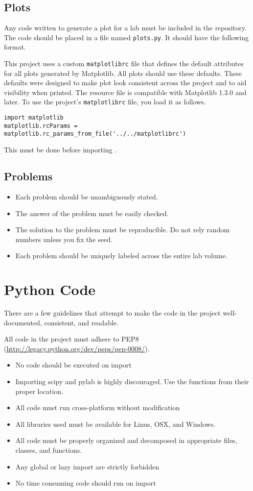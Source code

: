 \subsection{Plots}
Any code written to generate a plot for a lab must be included in the repository.
The code should be placed in a file named \texttt{plots.py}.
It should have the following format.


This project uses a custom \texttt{matplotlibrc} file that defines the default attributes for all plots generated by Matplotlib.
All plots should use these defaults.
These defaults were designed to make plot look consistent across the project and to aid visibility when printed.
The resource file is compatible with Matplotlib 1.3.0 and later.
To use the project's \texttt{matplotlibrc} file, you load it as follows.
\begin{lstlisting}
import matplotlib
matplotlib.rcParams = matplotlib.rc_params_from_file('../../matplotlibrc')
\end{lstlisting}
This must be done before importing .

\subsection{Problems}
\begin{itemize}
\item Each problem should be unambiguously stated.
\item The answer of the problem must be easily checked.
\item The solution to the problem must be reproducible.  Do not rely random numbers unless you fix the seed.
\item Each problem should be uniquely labeled across the entire lab volume.
\end{itemize}

\section{Python Code}
There are a few guidelines that attempt to make the code in the project well-documented, consistent, and readable.

All code in the project must adhere to PEP8 (\url{http://legacy.python.org/dev/peps/pep-0008/}).

\begin{itemize}
\item No code should be executed on import
\item Importing scipy and pylab is highly discouraged.  Use the functions from their proper location.
\item All code must run cross-platform without modification
\item All libraries used must be available for Linus, OSX, and Windows.
\item All code must be properly organized and decomposed in appropriate files, classes, and functions.
\item Any global or lazy import are strictly forbidden
\item No time consuming code should run on import
\end{itemize}

